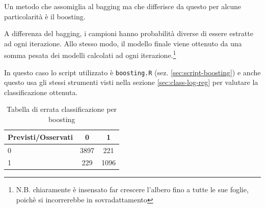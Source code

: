 Un metodo che assomiglia al bagging ma che differisce da questo per alcune
particolarità è il boosting.

A differenza del bagging, i campioni hanno probabilità diverse di essere
estratte ad ogni iterazione. Allo stesso modo, il modello finale viene ottenuto
da una somma pesata dei modelli calcolati ad ogni iterazione.\footnote{N.B.
chiaramente è insensato far crescere l'albero fino a tutte le sue foglie,
poichè si incorrerebbe in sovradattamento}

In questo caso lo script utilizzato è \texttt{boosting.R} (sez.
\ref{sec:script-boosting}) e anche questo usa gli stessi strumenti visti nella
sezione \ref{sec:class-log-reg} per valutare la classificazione ottenuta.

\begin{table}[H]
\begin{center}
\begin{tabular}{ | l || c | c | }
  \hline
    Previsti/Osservati & 0 & 1 \\ \hline \hline
    0 & 3897 & 221 \\ \hline
    1 & 229 & 1096 \\ \hline
\end{tabular}
  \caption{Tabella di errata classificazione per boosting}
\end{center}
\end{table}

